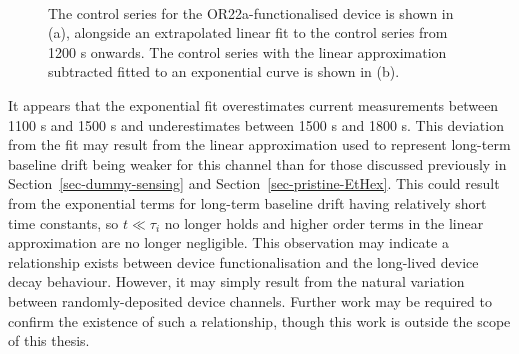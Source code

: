 \documentclass[
  a4paper,
]{scrbook}
\begin{document}
\begin{figure}
\begin{minipage}[t]{0.70\linewidth}
{{}

}

\end{minipage}%
%
\begin{minipage}[t]{0.15\linewidth}

{\centering 

~

}

\end{minipage}%

\caption{\label{fig-OR22a-control-series}The control series for the
OR22a-functionalised device is shown in (a), alongside an extrapolated
linear fit to the control series from 1200 s onwards. The control series
with the linear approximation subtracted fitted to an exponential curve
is shown in (b).}

\end{figure}

It appears that the exponential fit overestimates current measurements
between 1100 s and 1500 s and underestimates between 1500 s and 1800 s.
This deviation from the fit may result from the linear approximation
used to represent long-term baseline drift being weaker for this channel
than for those discussed previously in Section~\ref{sec-dummy-sensing}
and Section~\ref{sec-pristine-EtHex}. This could result from the
exponential terms for long-term baseline drift having relatively short
time constants, so \(t\ll\tau_i\) no longer holds and higher order terms
in the linear approximation are no longer negligible. This observation
may indicate a relationship exists between device functionalisation and
the long-lived device decay behaviour. However, it may simply result
from the natural variation between randomly-deposited device channels.
Further work may be required to confirm the existence of such a
relationship, though this work is outside the scope of this thesis.
\end{document}
